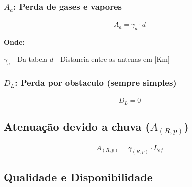 \documentclass[11pt]{article} %
\begin{document}
\subsubsection{$A_{a}$: Perda de gases e vapores}

\paragraph{}

\begin{equation}
A_{a} = {\gamma}_{a} \cdot d
\end{equation}

\textbf{Onde:}

$\gamma_{a}$ - Da tabela \newline
$d$ - Distancia entre as antenas em [Km]

\subsubsection{$D_{L}$: Perda por obstaculo (sempre simples)}

\paragraph{}

\begin{equation}
D_{L} = 0
\end{equation}

\subsection{Atenuação devido a chuva ($A_{(R, p)}$)}

\paragraph{}

\begin{equation}
A_{(R, p)} = {\gamma}_{(R, p)} \cdot L_{ef}
\end{equation}

\subsection{Qualidade e Disponibilidade}

\paragraph{}
\end{document}
